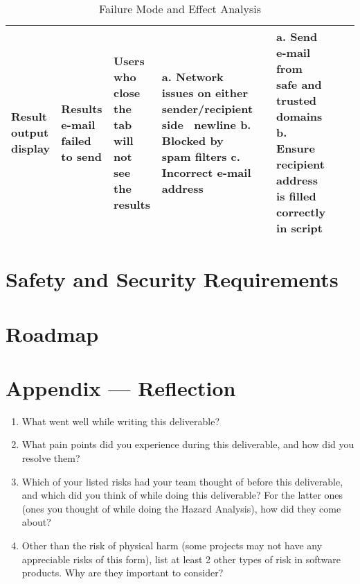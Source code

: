 \documentclass{article}
\begin{document}
\begin{landscape}
\begin{table}[ht]
{\begin{tabular}{|p{1.75cm}|p{4cm}|p{5cm}|p{5cm}|p{3cm}|p{5cm}|p{2cm}|p{2cm}|}
        \hline
        Result output display & Results e-mail failed to send & Users who close the tab will not see the results & a. Network issues on either sender/recipient side \ newline b. Blocked by spam filters \newline c. Incorrect e-mail address & & a. Send e-mail from safe and trusted domains b. Ensure recipient address is filled correctly in script & & \\
        \hline
        \end{tabular}
        } %
        \caption{Failure Mode and Effect Analysis}
        \label{table:fmea}
    \end{table}
\end{landscape}
   

\section{Safety and Security Requirements}


\section{Roadmap}


\newpage{}

\section*{Appendix --- Reflection}




\begin{enumerate}
    \item What went well while writing this deliverable? 
    \item What pain points did you experience during this deliverable, and how
    did you resolve them?
    \item Which of your listed risks had your team thought of before this
    deliverable, and which did you think of while doing this deliverable? For
    the latter ones (ones you thought of while doing the Hazard Analysis), how
    did they come about?
    \item Other than the risk of physical harm (some projects may not have any
    appreciable risks of this form), list at least 2 other types of risk in
    software products. Why are they important to consider?
\end{enumerate}
\end{document}
